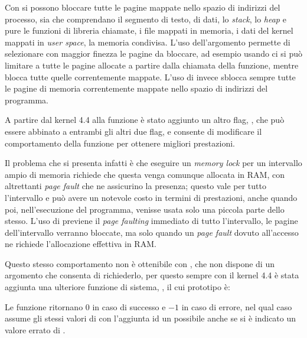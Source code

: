 Con  si possono bloccare tutte le pagine mappate nello spazio
di indirizzi del processo, sia che comprendano il segmento di testo, di dati,
lo \textit{stack}, lo \textit{heap} e pure le funzioni di libreria chiamate, i
file mappati in memoria, i dati del kernel mappati in \textit{user space}, la
memoria condivisa.  L'uso dell'argomento  permette di selezionare
con maggior finezza le pagine da bloccare, ad esempio usando
 ci si può limitare a tutte le pagine allocate a partire
dalla chiamata della funzione, mentre  blocca tutte quelle
correntemente mappate. L'uso di  invece sblocca sempre tutte
le pagine di memoria correntemente mappate nello spazio di indirizzi del
programma.

A partire dal kernel 4.4 alla funzione  è stato aggiunto un
altro flag, , che può essere abbinato a entrambi gli altri
due flag, e consente di modificare il comportamento della funzione per
ottenere migliori prestazioni.

Il problema che si presenta infatti è che eseguire un \textit{memory lock} per
un intervallo ampio di memoria richiede che questa venga comunque allocata in
RAM, con altrettanti \textit{page fault} che ne assicurino la presenza; questo
vale per tutto l'intervallo e può avere un notevole costo in termini di
prestazioni, anche quando poi, nell'esecuzione del programma, venisse usata
solo una piccola parte dello stesso. L'uso di  previene il
\textit{page faulting} immediato di tutto l'intervallo, le pagine
dell'intervallo verranno bloccate, ma solo quando un \textit{page fault}
dovuto all'accesso ne richiede l'allocazione effettiva in RAM.

Questo stesso comportamento non è ottenibile con , che non dispone
di un argomento  che consenta di richiederlo, per questo sempre
con il kernel 4.4 è stata aggiunta una ulteriore funzione di sistema,
, il cui prototipo è:

\begin{funcproto}{
}
{Le funzione ritornano $0$ in caso di successo e $-1$ in caso di errore, nel
  qual caso  assume gli stessi valori di  con
  l'aggiunta id un possibile  anche se si è indicato un valore
  errato di .}
\end{funcproto}

